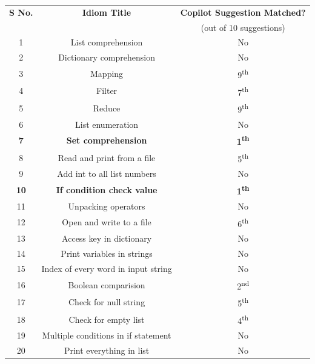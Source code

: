 \renewcommand{\arraystretch}{1.45}
\begin{table}[hbt!]

    \begin{tabular}{|c|c|c|}
        \hline
        \centering
         \textbf{S No.} & \textbf{Idiom Title} & \textbf{Copilot Suggestion Matched?}  \\
         & & (out of 10 suggestions) \\
         \hline
         1 & List comprehension & No \\
         \hline
         2 & Dictionary comprehension & No \\
         \hline
         3 & Mapping & 9\textsuperscript{th} \\
         \hline
         4 & Filter &  7\textsuperscript{th} \\
         \hline
         5 & Reduce & 9\textsuperscript{th} \\
         \hline
         6 & List enumeration & No \\
         \hline
         \textbf{7} & \textbf{Set comprehension} & \textbf{1\textsuperscript{th}} \\
         \hline
         8 & Read and print from a file & 5\textsuperscript{th} \\
         \hline
         9 & Add int to all list numbers & No \\
         \hline
         \textbf{10} & \textbf{If condition check value} & \textbf{1\textsuperscript{th}} \\
         \hline
         11 & Unpacking operators & No \\
         \hline
         12 & Open and write to a file & 6\textsuperscript{th} \\
         \hline
         13 & Access key in dictionary & No \\
         \hline
         14 & Print variables in strings & No \\
         \hline
         15 & Index of every word in input string & No \\
         \hline
         16 & Boolean comparision & 2\textsuperscript{nd} \\
         \hline
         17 & Check for null string & 5\textsuperscript{th} \\
         \hline
         18 & Check for empty list & 4\textsuperscript{th} \\
         \hline
         19 & Multiple conditions in if statement & No \\
         \hline
         20 & Print everything in list & No \\

\end{tabular}
\end{table}
